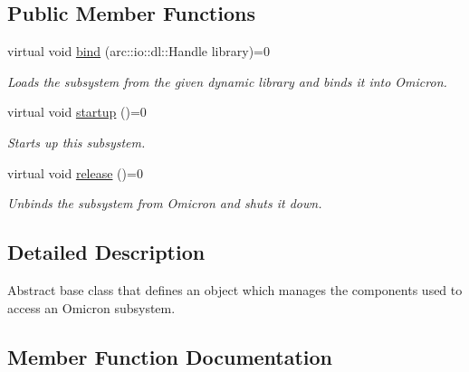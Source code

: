 \subsection*{Public Member Functions}
\begin{DoxyCompactItemize}
\item 
virtual void \hyperlink{classomi_1_1runtime_1_1ss_1_1_abstract_subsystem_a1d6cd9226416502ea0be8d1920a83cca}{bind} (arc\+::io\+::dl\+::\+Handle library)=0\hypertarget{classomi_1_1runtime_1_1ss_1_1_abstract_subsystem_a1d6cd9226416502ea0be8d1920a83cca}{}\label{classomi_1_1runtime_1_1ss_1_1_abstract_subsystem_a1d6cd9226416502ea0be8d1920a83cca}

\begin{DoxyCompactList}\small\item\em Loads the subsystem from the given dynamic library and binds it into Omicron. \end{DoxyCompactList}\item 
virtual void \hyperlink{classomi_1_1runtime_1_1ss_1_1_abstract_subsystem_ac8b1ad01306849a225c5d361abccf1cc}{startup} ()=0\hypertarget{classomi_1_1runtime_1_1ss_1_1_abstract_subsystem_ac8b1ad01306849a225c5d361abccf1cc}{}\label{classomi_1_1runtime_1_1ss_1_1_abstract_subsystem_ac8b1ad01306849a225c5d361abccf1cc}

\begin{DoxyCompactList}\small\item\em Starts up this subsystem. \end{DoxyCompactList}\item 
virtual void \hyperlink{classomi_1_1runtime_1_1ss_1_1_abstract_subsystem_ad5bf243e9a1b0ae94aaf3e6a998bdbf9}{release} ()=0
\begin{DoxyCompactList}\small\item\em Unbinds the subsystem from Omicron and shuts it down. \end{DoxyCompactList}\end{DoxyCompactItemize}


\subsection{Detailed Description}
Abstract base class that defines an object which manages the components used to access an Omicron subsystem. 

\subsection{Member Function Documentation}

